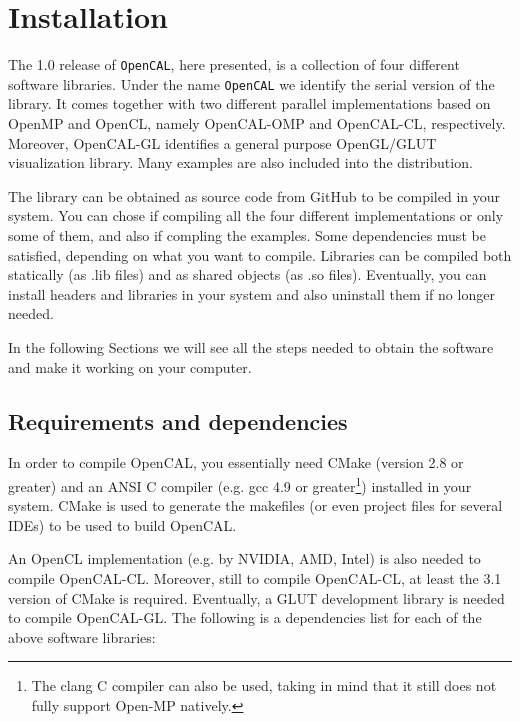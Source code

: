 \chapter{Installation} \label{ch:installation}

The 1.0 release of \verb'OpenCAL', here presented, is a collection of
four different software libraries. Under the name \verb'OpenCAL' we
identify the serial version of the library. It comes together with two
different parallel implementations based on OpenMP and OpenCL, namely
OpenCAL-OMP and OpenCAL-CL, respectively. Moreover, OpenCAL-GL
identifies a general purpose OpenGL/GLUT visualization library. Many
examples are also included into the distribution.

The library can be obtained as source code from GitHub to be compiled
in your system. You can chose if compiling all the four different
implementations or only some of them, and also if compling the
examples. Some dependencies must be satisfied, depending on what you
want to compile. Libraries can be compiled both statically (as .lib
files) and as shared objects (as .so files). Eventually, you can
install headers and libraries in your system and also uninstall them
if no longer needed.

In the following Sections we will see all the steps needed to obtain
the software and make it working on your computer.

\section{Requirements and dependencies}

In order to compile OpenCAL, you essentially need CMake (version 2.8
or greater) and an ANSI C compiler (e.g. gcc 4.9 or greater\footnote{
  The clang C compiler can also be used, taking in mind that it still
  does not fully support Open-MP natively.}) installed in your
system. CMake is used to generate the makefiles (or even project files
for several IDEs) to be used to build OpenCAL.

An OpenCL implementation (e.g. by NVIDIA, AMD, Intel) is also needed
to compile OpenCAL-CL. Moreover, still to compile OpenCAL-CL, at least
the 3.1 version of CMake is required. Eventually, a GLUT development
library is needed to compile OpenCAL-GL. The following is a
dependencies list for each of the above software libraries:

